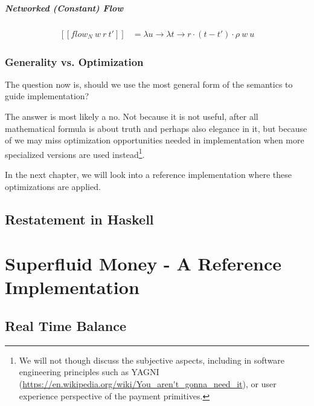 \paragraph{Networked (Constant) Flow}

\begin{equation}
    \begin{split}
        [\![flow_N\ w\ r\ t']\!] &=
        \lambda u \rightarrow \lambda t \rightarrow r \cdot (t - t') \cdot \rho\ w\ u
    \end{split}
\end{equation}

\subsection{Generality vs. Optimization}

The question now is, should we use the most general form of the semantics to guide implementation?

The answer is most likely a no. Not because it is not useful, after all mathematical formula is
about truth and perhaps also elegance in it, but because of we may miss optimization opportunities
needed in implementation when more specialized versions are used instead\footnote{We will not though
discuss the subjective aspects, including in software engineering principles such as YAGNI
(\url{https://en.wikipedia.org/wiki/You_aren't_gonna_need_it}), or user experience perspective of
the payment primitives.}.

In the next chapter, we will look into a reference implementation where these optimizations are
applied.

\section{Restatement in Haskell}



\chapter{Superfluid Money - A Reference Implementation}

\section{Real Time Balance}

